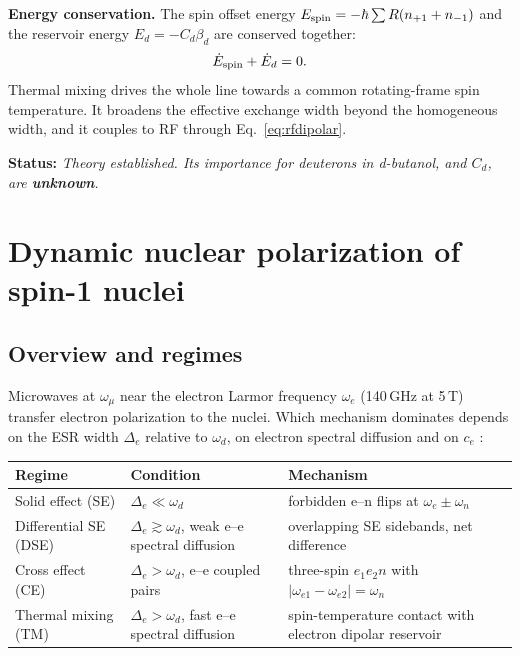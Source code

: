 \documentclass[11pt]{article}
\newcommand{\status}[1]{\par\noindent\textbf{\textsf{Status:}} \emph{#1}\par}
\begin{document}
\textbf{Energy conservation.} The spin offset energy
$E_{\rm spin}=-\hbar\sum R(n_{+1}+n_{-1})$ and the reservoir energy $E_d=-C_d\beta_d$ are
conserved together:
\[
\dot E_{\rm spin}+\dot E_d=0 .
\]
Thermal mixing drives the whole line towards a common rotating-frame spin temperature. It
broadens the effective exchange width beyond the homogeneous width, and it couples to RF
through Eq.~\eqref{eq:rfdipolar}.

\status{Theory established. Its importance for deuterons in d-butanol, and $C_d$, are
\textbf{unknown}.}

\section{Dynamic nuclear polarization of spin-1 nuclei}
\label{sec:dnp}

\subsection{Overview and regimes}
Microwaves at $\omega_\mu$ near the electron Larmor frequency $\omega_e$ (140\,GHz at 5\,T)
transfer electron polarization to the nuclei. Which mechanism dominates depends on the ESR
width $\Delta_e$ relative to $\omega_d$, on electron spectral diffusion and on $c_e$
\cite{Jeffries1963,AbragamGoldman1978,deBoer1976,Wenckebach2016}:

\begin{center}
\begin{tabular}{@{}>{\raggedright\arraybackslash}p{3.4cm}>{\raggedright\arraybackslash}p{5.2cm}>{\raggedright\arraybackslash}p{6.6cm}@{}}
\toprule
Regime & Condition & Mechanism \\
\midrule
Solid effect (SE) & $\Delta_e\ll\omega_d$ & forbidden e--n flips at $\omega_e\pm\omega_n$\\
Differential SE (DSE) & $\Delta_e\gtrsim\omega_d$, weak e--e spectral diffusion & overlapping SE sidebands, net difference\\
Cross effect (CE) & $\Delta_e>\omega_d$, e--e coupled pairs & three-spin $e_1e_2n$ with $|\omega_{e1}-\omega_{e2}|=\omega_n$\\
Thermal mixing (TM) & $\Delta_e>\omega_d$, fast e--e spectral diffusion & spin-temperature contact with electron dipolar reservoir\\
\bottomrule
\end{tabular}
\end{center}
\end{document}
